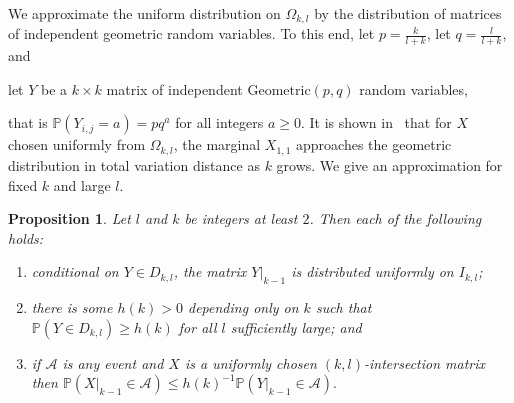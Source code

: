 \documentclass{daj}
\theoremstyle{plain}
\newtheorem{proposition}[theorem]{Proposition}
\theoremstyle{definition}
\begin{document}
We approximate the uniform distribution on $\Omega_{k,l}$ by the distribution of matrices of independent geometric random variables. To this end, let $p=\frac{k}{l+k}$, let $q=\frac{l}{l+k}$, and \begin{center}let $Y$ be a $k\times k$ matrix of independent $\mathrm{Geometric}(p,q)$ random variables,\end{center} that is $\mathbb{P}(Y_{i,j}=a)=pq^a$ for all integers $a\geq 0$. It is shown in~\cite{ditt} that for $X$ chosen uniformly from $\Omega_{k,l}$, the marginal $X_{1,1}$ approaches the geometric distribution in total variation distance as $k$ grows. We give an approximation for fixed $k$ and large $l$.

\begin{proposition}\label{dkbound}
Let $l$ and $k$ be integers at least $2$. Then each of the following holds: \begin{enumerate}\item[(i)]
conditional on $Y\in D_{k,l}$, the matrix $Y|_{k-1}$ is distributed uniformly on $I_{k,l}$;
\item[(ii)] there is some $h(k)>0$ depending only on $k$ such that $\mathbb{P}(Y\in D_{k,l})\geq h(k)$ for all $l$ sufficiently large; and
\item[(iii)]
 if $\mathcal{A}$ is any event and $X$ is a uniformly chosen $(k,l)$-intersection matrix then $\mathbb{P}(X|_{k-1}\in \mathcal{A})\leq h(k)^{-1}\mathbb{P}(Y|_{k-1}\in\mathcal{A}).$\end{enumerate}
\end{proposition}
\end{document}
